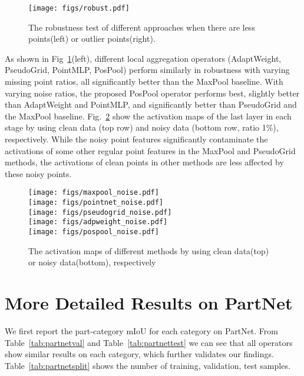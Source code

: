 \documentclass[runningheads]{llncs}
\begin{document}
\begin{figure}[t]
	\begin{center}
		\texttt{[image: figs/robust.pdf]}
	\end{center}
	\vspace{-2em}
	\caption{The robustness test of different approaches when there are less points(left) or outlier points(right).}
	\vspace{-1em}
	\label{fig:robust}
\end{figure}

As shown in Fig~\ref{fig:robust}(left), different local aggregation operators (AdaptWeight, PseudoGrid, PointMLP, PosPool) perform similarly in robustness with varying missing point ratios, all significantly better than the MaxPool baseline. With varying noise ratios, the proposed PosPool operator performs best, slightly better than AdaptWeight and PointMLP, and significantly better than PseudoGrid and the MaxPool baseline. Fig.~\ref{fig:noise_act} show the activation maps of the last layer in each stage by using clean data (top row) and noisy data (bottom row, ratio 1\%), respectively. While the noisy point features significantly contaminate the activations of some other regular point features in the MaxPool and PseudoGrid methods, the activations of clean points in other methods are less affected by these noisy points.

\begin{figure}[t]
	\begin{center}
		\texttt{[image: figs/maxpool\_noise.pdf]} \\
		\texttt{[image: figs/pointnet\_noise.pdf]} \\
		\texttt{[image: figs/pseudogrid\_noise.pdf]} \\
		\texttt{[image: figs/adpweight\_noise.pdf]} \\
		\texttt{[image: figs/pospool\_noise.pdf]} \\
	\end{center}
	\vspace{-2em}
	\caption{The activation maps of different methods by using clean data(top) or noisy data(bottom), respectively}
	\vspace{-1em}
	\label{fig:noise_act}
\end{figure}

\section{More Detailed Results on PartNet}
We first report the part-category mIoU for each category on PartNet.  From Table~\ref{tab:partnetval} and Table~\ref{tab:partnettest} we can see that all operators show similar results on each category, which further validates our findings. Table~\ref{tab:partnetsplit} shows the number of training, validation, test samples.
\end{document}
